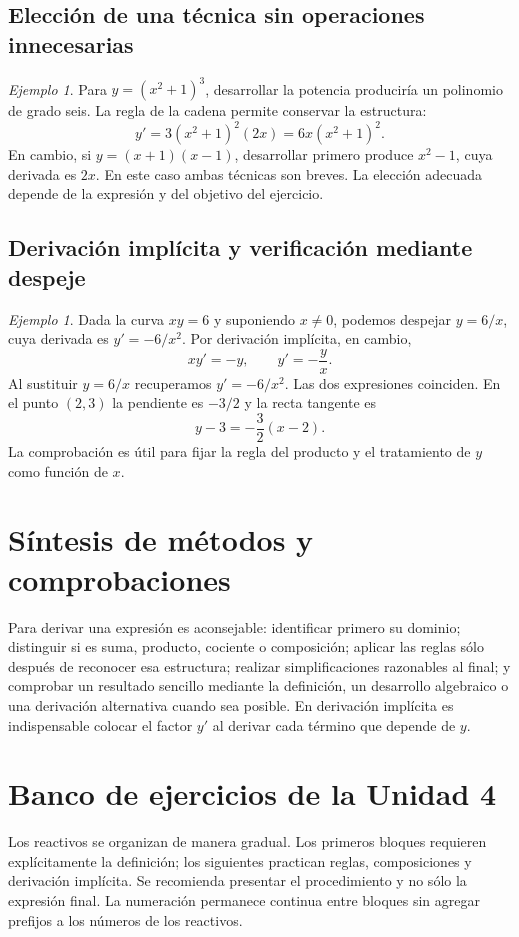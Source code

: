 \documentclass[12pt]{article}
\theoremstyle{remark}
\newtheorem{ejemplo}[definicion]{Ejemplo}
\begin{document}
\subsection*{Elección de una técnica sin operaciones innecesarias}
\begin{ejemplo}
Para $y=(x^2+1)^3$, desarrollar la potencia produciría un polinomio de grado seis. La regla de la cadena permite conservar la estructura:
\[
y'=3(x^2+1)^2(2x)=\boxed{6x(x^2+1)^2}.
\]
En cambio, si $y=(x+1)(x-1)$, desarrollar primero produce $x^2-1$, cuya derivada es $2x$. En este caso ambas técnicas son breves. La elección adecuada depende de la expresión y del objetivo del ejercicio.
\end{ejemplo}

\subsection*{Derivación implícita y verificación mediante despeje}
\begin{ejemplo}
Dada la curva $xy=6$ y suponiendo $x\ne0$, podemos despejar $y=6/x$, cuya derivada es $y'=-6/x^2$. Por derivación implícita, en cambio,
\[
xy'= -y,\qquad y'=-\frac{y}{x}.
\]
Al sustituir $y=6/x$ recuperamos $y'=-6/x^2$. Las dos expresiones coinciden. En el punto $(2,3)$ la pendiente es $-3/2$ y la recta tangente es
\[
\boxed{y-3=-\frac32(x-2).}
\]
La comprobación es útil para fijar la regla del producto y el tratamiento de $y$ como función de $x$.
\end{ejemplo}

\section{Síntesis de métodos y comprobaciones}
Para derivar una expresión es aconsejable: identificar primero su dominio; distinguir si es suma, producto, cociente o composición; aplicar las reglas sólo después de reconocer esa estructura; realizar simplificaciones razonables al final; y comprobar un resultado sencillo mediante la definición, un desarrollo algebraico o una derivación alternativa cuando sea posible. En derivación implícita es indispensable colocar el factor $y'$ al derivar cada término que depende de $y$.

\section{Banco de ejercicios de la Unidad 4}
Los reactivos se organizan de manera gradual. Los primeros bloques requieren explícitamente la definición; los siguientes practican reglas, composiciones y derivación implícita. Se recomienda presentar el procedimiento y no sólo la expresión final. La numeración permanece continua entre bloques sin agregar prefijos a los números de los reactivos.
\end{document}
